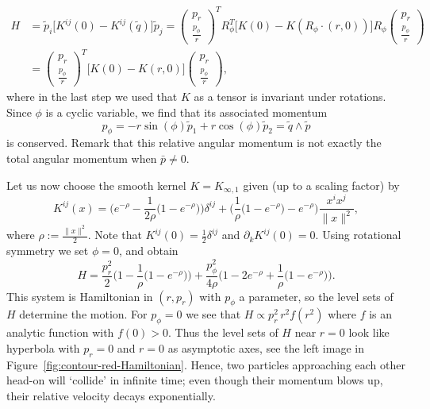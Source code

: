 \documentclass[12pt]{amsart}
\begin{document}
\begin{equation*}
  \begin{aligned}
  H &= \tilde{p}_i \big[ K^{ij}(0) - K^{ij}(\tilde{q}) \big] \tilde{p}_j
     = \begin{pmatrix} p_r \\ \frac{p_\phi}{r} \end{pmatrix}^T R_\phi^T
       \big[ K(0) - K(R_\phi\cdot(r,0)) \big] R_\phi
       \begin{pmatrix} p_r \\ \frac{p_\phi}{r} \end{pmatrix}\\
    &= \begin{pmatrix} p_r \\ \frac{p_\phi}{r} \end{pmatrix}^T
       \big[ K(0) - K(r,0) \big] \begin{pmatrix} p_r \\ \frac{p_\phi}{r} \end{pmatrix},
  \end{aligned}
\end{equation*}
where in the last step we used that $K$ as a tensor is invariant under
rotations. Since $\phi$ is a cyclic variable, we find that its
associated momentum
\begin{equation*}
  p_\phi = -r \sin(\phi) \tilde{p}_1 + r \cos(\phi) \tilde{p}_2
            = \tilde{q} \wedge \tilde{p}
\end{equation*}
is conserved. Remark that this relative angular momentum is not
exactly the total angular momentum when $\bar{p} \neq 0$.

Let us now choose the smooth kernel $K = K_{\infty,1}$ given
(up to a scaling factor) by
%
{\newcommand{\e}{e^{-\rho}}
\begin{equation}\label{eq:smooth-kernel}
  K^{ij}(x) = \Big(\e - \frac{1}{2\rho}\big(1 - \e\big)\Big)\delta^{ij}
    + \Big(\frac{1}{\rho}\big(1 - \e\big) - \e\Big)\frac{x^i x^j}{\|x\|^2},
\end{equation}%
}%
where $\rho := \frac{\|x\|^2}{2}$. Note that
$K^{ij}(0) = \frac{1}{2} \delta^{ij}$ and $\partial_k K^{ij}(0) = 0$.
Using rotational symmetry we set $\phi = 0$, and obtain
\begin{equation}\label{eq:H-rot-reduced}
  H = \frac{p_r^2      }{2}    \Big(1 - \frac{1}{\rho}\big(1-e^{-\rho}\big)\Big)
     +\frac{p_\phi^2}{4\rho}\Big(1 - 2e^{-\rho} + \frac{1}{\rho}\big(1-e^{-\rho}\big)\Big).
\end{equation}
This system is Hamiltonian in $(r,p_r)$ with $p_\phi$ a parameter, so
the level sets of $H$ determine the motion. For $p_\phi = 0$ we see
that $H \propto p_r^2\, r^2 f(r^2)$ where $f$ is an analytic function
with $f(0) > 0$. Thus the level sets of $H$ near $r = 0$ look like
hyperbola with $p_r = 0$ and $r = 0$ as asymptotic axes, see the left image in
Figure~\eqref{fig:contour-red-Hamiltonian}. Hence, two particles approaching
each other head-on will `collide' in infinite time; even though their
momentum blows up, their relative velocity decays exponentially.
\end{document}
